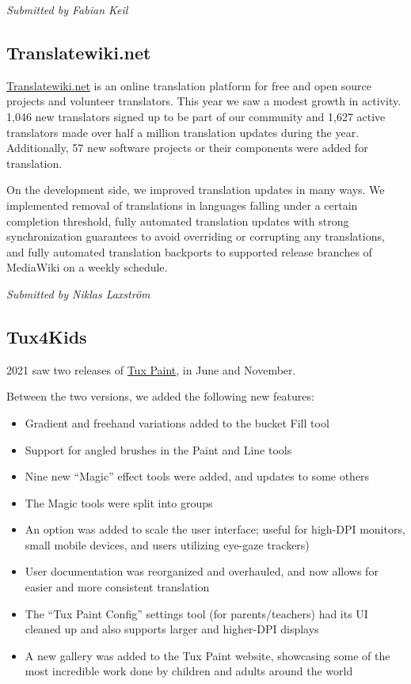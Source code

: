 \documentclass[a4paper]{report}
\begin{document}
{\em Submitted by Fabian Keil}

\subsection{Translatewiki.net}

\href{https://translatewiki.net/}{Translatewiki.net} is an online translation platform for free and open source projects and volunteer translators. This year we saw a modest growth in activity. 1,046 new translators signed up to be part of our community and 1,627 active translators made over half a million translation updates during the year. Additionally, 57 new software projects or their components were added for translation.

On the development side, we improved translation updates in many ways. We implemented removal of translations in languages falling under a certain completion threshold, fully automated translation updates with strong synchronization guarantees to avoid overriding or corrupting any translations, and fully automated translation backports to supported release branches of MediaWiki on a weekly schedule.

{\em Submitted by Niklas Laxström}

\subsection{Tux4Kids}

2021 saw two releases of \href{https://tuxpaint.org/}{Tux Paint}, in June and November.

Between the two versions, we added the following new features:

\begin{itemize}

\item Gradient and freehand variations added to the bucket Fill tool

\item Support for angled brushes in the Paint and Line tools

\item Nine new ``Magic'' effect tools were added, and updates to some others

\item The Magic tools were split into groups

\item An option was added to scale the user interface; useful for high-DPI monitors, small mobile devices, and users utilizing eye-gaze trackers)

\item User documentation was reorganized and overhauled, and now allows for easier and more consistent translation

\item The ``Tux Paint Config'' settings tool (for parents/teachers) had its UI cleaned up and also supports larger and higher-DPI displays

\item A new gallery was added to the Tux Paint website, showcasing some of the most incredible work done by children and adults around the world

\end{itemize}
\end{document}
